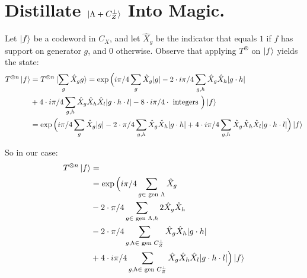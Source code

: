\documentclass[manuscript,screen,review]{acmart}
\begin{document}
  \section{Distillate $\ket{ \Lambda + C_{Z}^{\perp}}$ Into Magic.}
Let $\ket{f}$ be a codeword in $C_{X}$, and let $\hat{X}_{g}$ be the indicator that equals $1$ if $f$ has support on generator $g$, and $0$ otherwise. Observe that applying $T^{\otimes}$ on $\ket{f}$ yields the state:
\begin{equation*}
  \begin{split}
    T^{\otimes n}\ket{f} & =  T^{\otimes n}\ket{\sum_{g} \hat{X}_{g}g } = \exp \Big( i\pi/4 \sum_{g} \hat{X}_{g}|g|  -  2 \cdot i \pi/4 \sum_{g,h} \hat{X}_{g}\hat{X}_{h}|g\cdot h| \\
    & +  4 \cdot i\pi/4 \sum_{g,h} \hat{X}_{g}\hat{X}_{h}\hat{X}_{l}|g\cdot h \cdot l| -   8  \cdot i\pi/4 \cdot \text{ integers } \Big) \ket{f} \\
    & = \exp \Big( i\pi/4 \sum_{g} \hat{X}_{g}|g|  -  2 \cdot \pi/4 \sum_{g,h} \hat{X}_{g}\hat{X}_{h}|g\cdot h| +  4 \cdot i\pi/4 \sum_{g,h} \hat{X}_{g}\hat{X}_{h}\hat{X}_{l}|g\cdot h \cdot l| \Big) \ket{f}
  \end{split}
\end{equation*}

So in our case: 
\begin{equation*}
  \begin{split}
    T^{\otimes n}\ket{f} & = \\
    & = \exp \Big( i\pi/4 \sum_{g \in \text{ gen }\Lambda } \hat{X}_{g}  \\
    & -  2 \cdot \pi/4 \sum_{g \in \text{ gen }\Lambda ,h} 2 \hat{X}_{g}\hat{X}_{h}  \\
    & -  2 \cdot \pi/4 \sum_{g ,h \in \text{ gen } C_{Z}^{\perp}} \hat{X}_{g}\hat{X}_{h}|g\cdot h| \\
   \ifdefined\MORECALC & +  \cancel{4 \cdot i\pi/4 \sum_{g \in \Lambda ,h} \hat{X}_{g}\hat{X}_{h}\hat{X}_{l}2} \\ \fi
 & +  4 \cdot i\pi/4 \sum_{g,h \in \text{ gen } C_{Z}^{\perp}} \hat{X}_{g}\hat{X}_{h}\hat{X}_{l}|g\cdot h \cdot l|  \Big) \ket{f}
  \end{split}
\end{equation*}
\end{document}

